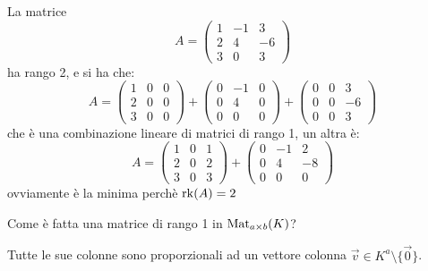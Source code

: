 \documentclass[../main.tex]{subfiles}
\begin{document}
\begin{example}
    La matrice
    \begin{equation*}
        A = \begin{pmatrix}
            1 & -1 & 3  \\
            2 & 4  & -6 \\
            3 & 0  & 3
        \end{pmatrix}
    \end{equation*}
    ha rango 2, e si ha che:
    \begin{equation*}
        A = \begin{pmatrix}
            1 & 0 & 0 \\
            2 & 0 & 0 \\
            3 & 0 & 0
        \end{pmatrix} + \begin{pmatrix}
            0 & -1 & 0 \\
            0 & 4  & 0 \\
            0 & 0  & 0
        \end{pmatrix} + \begin{pmatrix}
            0 & 0 & 3  \\
            0 & 0 & -6 \\
            0 & 0 & 3
        \end{pmatrix}
    \end{equation*}
    che è una combinazione lineare di matrici di rango 1, un altra è:
    \begin{equation*}
        A = \begin{pmatrix}
            1 & 0 & 1 \\
            2 & 0 & 2 \\
            3 & 0 & 3
        \end{pmatrix} + \begin{pmatrix}
            0 & -1 & 2  \\
            0 & 4  & -8 \\
            0 & 0  & 0
        \end{pmatrix}
    \end{equation*}
    ovviamente è la minima perchè $\operatorname{rk}(A) = 2$
\end{example}

Come è fatta una matrice di rango 1 in $\operatorname{Mat}_{a \times b}(K)$?

Tutte le sue colonne sono proporzionali ad un vettore colonna $\overrightarrow{v} \in K^a \setminus \{\overrightarrow{0}\}$.
\end{document}

